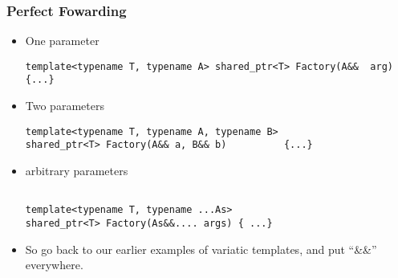 \begin{frame}[fragile,t]
\frametitle{Perfect Fowarding}
\begin{itemize}[<+->]
\item One parameter
{\scriptsize\begin{verbatim}
template<typename T, typename A> shared_ptr<T> Factory(A&&  arg) {...}
\end{verbatim}
}
\item Two parameters
{\scriptsize\begin{verbatim}
template<typename T, typename A, typename B>
shared_ptr<T> Factory(A&& a, B&& b)          {...}

\end{verbatim}
}
\item arbitrary parameters
{\scriptsize\begin{verbatim}

template<typename T, typename ...As>
shared_ptr<T> Factory(As&&.... args) { ...}
\end{verbatim}
}

\vskip 12pt
\item So go back to our earlier examples of variatic templates, and
  put ``\&\&'' everywhere.
\end{itemize}
\end{frame}

